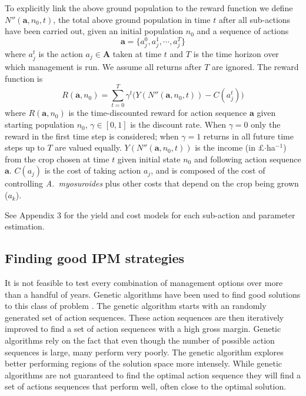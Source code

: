 \documentclass[9pt,twocolumn,twoside,lineno]{pnas-new}
\begin{document}
{To explicitly link the above ground population to the reward function we define $N''(\mathbf{a}, n_0, t)$, the total above ground population in time $t$ after all sub-actions have been carried out, given an initial population $n_0$ and a sequence of actions 
\begin{equation}
	\mathbf{a} = \{a_j^0, a_j^1, \cdots, a_j^T\}
\end{equation}	  
where $a_j^t$ is the action $a_j \in \mathbf{A}$ taken at time $t$ and $T$ is the time horizon over which management is run. We assume all returns after $T$ are ignored. The reward function is  
\begin{equation}
	R(\mathbf{a}, n_0) = \sum_{t=0}^T \gamma^t \Big( Y(N''(\mathbf{a}, n_0, t)) - C(a_j^t) \Big)
\end{equation}
where $R(\mathbf{a}, n_0)$ is the time-discounted reward for action sequence $\mathbf{a}$ given starting population $n_0$, $\gamma \in [0, 1]$ is the discount rate. When $\gamma = 0$ only the reward in the first time step is considered; when $\gamma = 1$ returns in all future time steps up to $T$ are valued equally. $Y(N''(\mathbf{a}, n_0, t))$ is the income (in \pounds$\cdot$ha$^{-1}$) from the crop chosen at time $t$ given initial state $n_0$ and following action sequence $\mathbf{a}$. $C(a_j)$ is the cost of taking action $a_j$, and is composed of the cost of controlling \textit{A.\ myosuroides} plus other costs that depend on the crop being grown ($a_k$).   

See Appendix 3 for the yield and cost models for each sub-action and parameter estimation.

\subsection*{Finding good IPM strategies} 
It is not feasible to test every combination of management options over more than a handful of years. Genetic algorithms have been used to find good solutions to this class of problem \citep{Tayl2004GA, Carr2010}. The genetic algorithm starts with an randomly generated set of action sequences. These action sequences are then iteratively improved to find a set of action sequences with a high gross margin. Genetic algorithms rely on the fact that even though the number of possible action sequences is large, many perform very poorly. The genetic algorithm explores better performing regions of the solution space more intensely. While genetic algorithms are not guaranteed to find the optimal action sequence they will find a set of actions sequences that perform well, often close to the optimal solution.   

}
\end{document}
